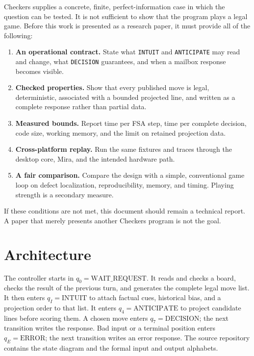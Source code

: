 \documentclass[11pt]{article}
\begin{document}
Checkers supplies a concrete, finite, perfect-information case in which the
question can be tested. It is not sufficient to show that the program plays a
legal game. Before this work is presented as a research paper, it must provide
all of the following:

\begin{enumerate}
  \item \textbf{An operational contract.} State what \texttt{INTUIT} and
  \texttt{ANTICIPATE} may read and change, what \texttt{DECISION} guarantees,
  and when a mailbox response becomes visible.
  \item \textbf{Checked properties.} Show that every published move is legal,
  deterministic, associated with a bounded projected line, and written as a
  complete response rather than partial data.
  \item \textbf{Measured bounds.} Report time per FSA step, time per complete
  decision, code size, working memory, and the limit on retained projection
  data.
  \item \textbf{Cross-platform replay.} Run the same fixtures and traces
  through the desktop core, Mira, and the intended hardware path.
  \item \textbf{A fair comparison.} Compare the design with a simple,
  conventional game loop on defect localization, reproducibility, memory, and
  timing. Playing strength is a secondary measure.
\end{enumerate}

If these conditions are not met, this document should remain a technical
report. A paper that merely presents another Checkers program is not the goal.

\section{Architecture}

The controller starts in $q_0=\mathrm{WAIT\_REQUEST}$. It reads and checks a
board, checks the result of the previous turn, and generates the complete
legal move list. It then enters $q_I=\mathrm{INTUIT}$ to attach factual cues,
historical bias, and a projection order to that list. It enters
$q_4=\mathrm{ANTICIPATE}$ to project candidate lines before scoring them. A
chosen move enters $q_7=\mathrm{DECISION}$; the next transition writes the
response. Bad input or a terminal position enters $q_E=\mathrm{ERROR}$; the
next transition writes an error response. The source repository contains the
state diagram and the formal input and output alphabets.
\end{document}

